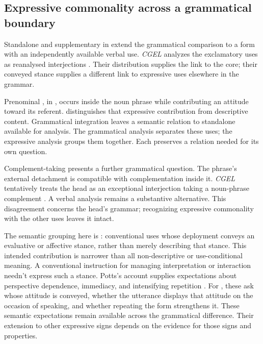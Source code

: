 \documentclass[12pt]{article}
\begin{document}
\subsection{Expressive commonality across a grammatical boundary}\label{sec:damn-profiles}

Standalone  and supplementary  in
 extend the grammatical comparison
to a form with an independently available verbal use. \textit{CGEL}
analyzes the exclamatory uses as reanalysed interjections
\citep[1361]{HuddlestonPullum2002}. Their distribution supplies the link
to the core; their conveyed stance supplies a different link to
expressive uses elsewhere in the grammar.

Prenominal , in , occurs inside the
noun phrase while contributing an attitude toward its referent.
\textcite[171, 182]{potts2007} distinguishes that expressive contribution
from descriptive content. Grammatical integration leaves a
semantic relation to standalone  available for analysis.
The grammatical analysis separates these uses; the expressive analysis
groups them together. Each preserves a relation needed for its own
question.

Complement-taking  presents a further
grammatical question. The phrase's external detachment is compatible with
complementation inside it. \textit{CGEL} tentatively treats the head as
an exceptional interjection taking a noun-phrase complement
\citep[1361 n.~70]{HuddlestonPullum2002}. A verbal analysis remains a
substantive alternative. This disagreement concerns the head's grammar;
recognizing expressive commonality with the other  uses
leaves it intact.

The semantic grouping here is : conventional uses
whose deployment conveys an evaluative or affective stance, rather than
merely describing that stance. This intended contribution is narrower than
all non-descriptive or use-conditional meaning. A conventional instruction
for managing interpretation or interaction needn't express such a stance.
Potts's account supplies expectations about perspective dependence, immediacy,
and intensifying repetition \citep[166--167]{potts2007}. For ,
these ask whose attitude is conveyed, whether the utterance displays
that attitude on the occasion of speaking, and whether repeating the
form strengthens it. These semantic expectations remain available across
the grammatical difference. Their extension to other expressive signs
depends on the evidence for those signs and properties.
\end{document}
